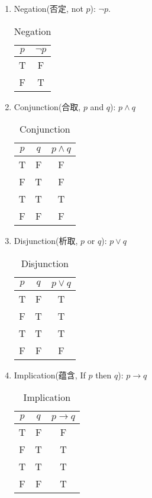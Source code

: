 \begin{enumerate}
    \item Negation(否定, not $p$): $\neg p$.
    \begin{table}[H]
        \centering
        \begin{tabular}[c]{|c|c|}\hline
            $p$ & $\neg p$\\ \hline
            T&F\\F&T \\ \hline
        \end{tabular}
        \caption{Negation}
    \end{table}

    \item Conjunction(合取, $p$ and $q$): $p \land q$
    \begin{table}[H]
        \centering
        \begin{tabular}[c]{|cc|c|}\hline
            $p$&$q$&$p\land q$\\ \hline
            T & F & F \\
            F & T & F \\
            T & T & T \\
            F & F & F \\ \hline
        \end{tabular}
        \caption{Conjunction}
    \end{table}

    \item Disjunction(析取, $p$ or $q$): $p \lor q$
    \begin{table}[H]
        \centering
        \begin{tabular}[c]{|cc|c|}\hline
            $p$&$q$&$p\lor q$\\ \hline
            T & F & T \\
            F & T & T \\
            T & T & T \\
            F & F & F \\ \hline
        \end{tabular}
        \caption{Disjunction}
    \end{table}
    
    \item Implication(蕴含, If $p$ then $q$): $p\longrightarrow q$
    \begin{table}[H]
        \centering
        \begin{tabular}[c]{|cc|c|}\hline
            $p$&$q$&$p\longrightarrow q$\\ \hline
            T & F & F \\
            F & T & T \\
            T & T & T \\
            F & F & T \\ \hline
        \end{tabular}
        \caption{Implication}
    \end{table}


\end{enumerate}
